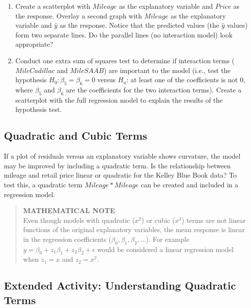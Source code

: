 \documentclass[
]{report}
\providecommand{\tightlist}{%
  \setlength{\itemsep}{0pt}\setlength{\parskip}{0pt}}
\theoremstyle{definition}
\theoremstyle{definition}
\theoremstyle{definition}
\theoremstyle{definition}
\theoremstyle{remark}
\begin{document}
\begin{enumerate}
\def\labelenumi{\alph{enumi}.}
\tightlist
\item
  Create a scatterplot with \(Mileage\) as the explanatory variable and \(Price\) as the response. Overlay a second graph with \(Mileage\) as the explanatory variable and \(\hat y\) as the response. Notice that the predicted values (the \(\hat y\) values) form two separate lines. Do the parallel lines (no interaction model) look appropriate?
\item
  Conduct one extra sum of squares test to determine if interaction terms (\(MileCadillac\) and \(MileSAAB\)) are important to the model (i.e., test the hypothesis \(H_0: \beta_5 = \beta_6 = 0\) versus \(H_a\): at least one of the coefficients is not 0, where \(\beta_5\) and \(\beta_6\) are the coefficients for the two interaction terms). Create a scatterplot with the full regression model to explain the results of the hypothesis test.
\end{enumerate}

\hypertarget{quadratic-and-cubic-terms}{%
\subsection{Quadratic and Cubic Terms}\label{quadratic-and-cubic-terms}}

If a plot of residuals versus an explanatory variable shows curvature, the model may be improved by including a quadratic term. Is the relationship between mileage and retail price linear or quadratic for the Kelley Blue Book data? To test this, a quadratic term \(Mileage*Mileage\) can be created and included in a regression model.

\begin{quote}
\textbf{MATHEMATICAL NOTE}\\
Even though models with quadratic (\(x^2\)) or cubic (\(x^3\)) terms are not linear functions of the original explanatory variables, the mean response is linear in the regression coefficients (\(\beta_0, \beta_1, \beta_2, \dots\)). For example \(y = \beta_0 + z_1 \beta_1 + z_2 \beta_2 + \epsilon\) would be considered a linear regression model when \(z_1 = x\) and \(z_2 = x^2\).
\end{quote}

\hypertarget{extended-activity-understanding-quadratic-terms}{%
\subsection*{Extended Activity: Understanding Quadratic Terms}\label{extended-activity-understanding-quadratic-terms}}
\end{document}
